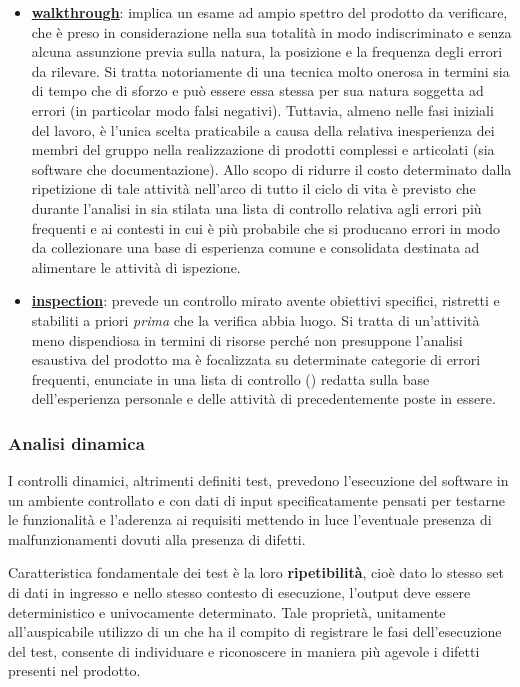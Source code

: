\begin{itemize}
\item \textbf{\underline{walkthrough}}: implica un esame ad ampio spettro del prodotto da verificare, che è preso in considerazione nella sua totalità in modo indiscriminato e senza alcuna assunzione previa sulla natura, la posizione e la frequenza degli errori da rilevare. Si tratta notoriamente di una tecnica molto onerosa in termini sia di tempo che di sforzo e può essere essa stessa per sua natura soggetta ad errori (in particolar modo falsi negativi). Tuttavia, almeno nelle fasi iniziali del lavoro, è l'unica scelta praticabile a causa della relativa inesperienza dei membri del gruppo nella realizzazione di prodotti complessi e articolati (sia software che documentazione). Allo scopo di ridurre il costo determinato dalla ripetizione di tale attività nell'arco di tutto il ciclo di vita è previsto che durante l'analisi in  sia stilata una lista di controllo relativa agli errori più frequenti e ai contesti in cui è più probabile che si producano errori in modo da collezionare una base di esperienza comune e consolidata destinata ad alimentare le attività di ispezione.

\item \textbf{\underline{inspection}}: prevede un controllo mirato avente obiettivi specifici, ristretti e stabiliti a priori \textit{prima} che la verifica abbia luogo. Si tratta di un'attività meno dispendiosa in termini di risorse perché non presuppone l'analisi esaustiva del prodotto ma è focalizzata su determinate categorie di errori frequenti, enunciate in una lista di controllo () redatta sulla base dell'esperienza personale e delle attività di  precedentemente poste in essere.
\end{itemize}


\subsubsection{Analisi dinamica} 
I controlli dinamici, altrimenti definiti test, prevedono l'esecuzione del software in un ambiente controllato e con dati di input specificatamente pensati per testarne le funzionalità e l'aderenza ai requisiti mettendo in luce l'eventuale presenza di malfunzionamenti dovuti alla presenza di difetti.

Caratteristica fondamentale dei test è la loro \textbf{ripetibilità}, cioè dato lo stesso set di dati in ingresso e nello stesso contesto di esecuzione, l'output deve essere deterministico e univocamente determinato. Tale proprietà, unitamente all'auspicabile utilizzo di un  che ha il compito di registrare le fasi dell'esecuzione del test, consente di individuare e riconoscere in maniera più agevole i difetti presenti nel prodotto.

